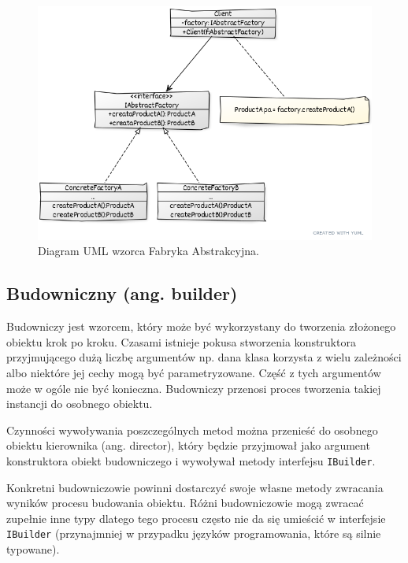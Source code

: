 \begin{figure}[hbt!]
	\centering
	\includegraphics[width=0.9\linewidth]{images/AbstractFactoryUml}
	\caption{Diagram UML wzorca Fabryka Abstrakcyjna.}
	\label{lab2/fig/AbstractFactoryUml}
\end{figure}
%


\subsection{Budowniczny (ang. builder)}
Budowniczy jest wzorcem, który może być wykorzystany do tworzenia złożonego obiektu krok po kroku. Czasami istnieje pokusa stworzenia konstruktora przyjmującego dużą liczbę argumentów np. dana klasa korzysta z wielu zależności albo niektóre jej cechy mogą być parametryzowane. Część z tych argumentów może w ogóle nie być konieczna. Budowniczy przenosi proces tworzenia takiej instancji do osobnego obiektu. 

Czynności wywoływania poszczególnych metod można przenieść do osobnego obiektu kierownika (ang. director), który będzie przyjmował jako argument konstruktora obiekt budowniczego i wywoływał metody interfejsu \texttt{IBuilder}.

Konkretni budowniczowie powinni dostarczyć swoje własne metody zwracania wyników procesu budowania obiektu. Różni budowniczowie mogą zwracać zupełnie inne typy dlatego tego procesu często nie da się umieścić w interfejsie \texttt{IBuilder} (przynajmniej w przypadku języków programowania, które są silnie typowane). 
 
